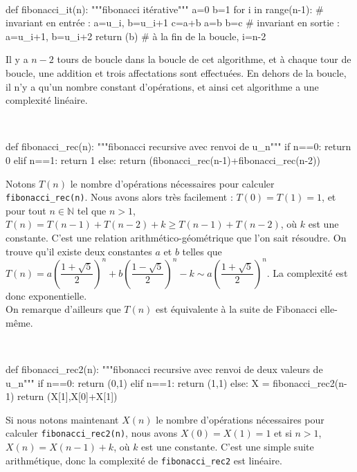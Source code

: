 \ifprof
\begin{corrige}
\question\
\begin{python}
def fibonacci_it(n):
    """fibonacci itérative"""
    a=0
    b=1
    for i in range(n-1): # invariant en entrée : a=u_i, b=u_{i+1}
        c=a+b
        a=b
        b=c
        # invariant en sortie : a=u_{i+1}, b=u_{i+2}
    return (b) # à la fin de la boucle, i=n-2
\end{python}
Il y a $n-2$ tours de boucle dans la boucle de cet algorithme, et à chaque tour de boucle, une addition et trois 
affectations sont effectuées. En dehors de la boucle, il n'y a qu'un nombre constant d'opérations, et ainsi cet 
algorithme a une complexité linéaire.

\question\
\begin{python}
def fibonacci_rec(n):
    """fibonacci recursive avec renvoi de u_n"""
    if n==0:
        return 0
    elif n==1:
        return 1
    else:
        return (fibonacci_rec(n-1)+fibonacci_rec(n-2))
\end{python}
Notons $T(n)$ le nombre d'opérations nécessaires pour calculer \texttt{fibonacci\_rec(n)}. Nous avons alors très 
facilement : $T(0)=T(1)=1$, et pour tout $n\in\mathbb N$ tel que $n>1$, $T(n)=T(n-1)+T(n-2)+k\geq T(n-1)+T(n-2)$, où 
$k$ est une constante. C'est une relation arithmético-géométrique que l'on sait résoudre. On trouve qu'il existe deux 
constantes $a$ et $b$ telles que $T(n)=a\left(\dfrac{1+\sqrt 5}2\right)^n+b\left(\dfrac{1-\sqrt 5}2\right)^n-k\sim 
a\left(\dfrac{1+\sqrt 5}2\right)^n$. La complexité est donc exponentielle.\\
On remarque d'ailleurs que $T(n)$ est équivalente à la suite de Fibonacci elle-même.

\question\
\begin{python}
def fibonacci_rec2(n):
    """fibonacci recursive avec renvoi de deux valeurs de u_n"""
    if n==0:
        return (0,1)
    elif n==1:
        return (1,1)
    else:
	X = fibonacci_rec2(n-1)
        return (X[1],X[0]+X[1])
\end{python}

Si nous notons maintenant $X(n)$ le nombre d'opérations nécessaires pour calculer \texttt{fibonacci\_rec2(n)}, nous 
avons $X(0)=X(1)=1$ et si $n>1$, $X(n)=X(n-1)+k$, où $k$ est une constante. C'est une simple suite arithmétique, donc 
la complexité de \texttt{fibonacci\_rec2} est linéaire.

\end{corrige}
\else
\fi


